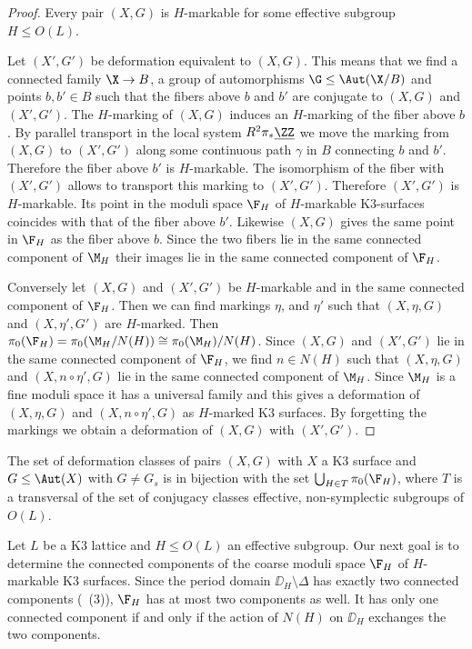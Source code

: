 \begin{proof}
Every pair $(X,G)$ is $H$-markable for some effective subgroup $H\leq O(L)$.

Let $(X',G')$ be deformation equivalent to $(X,G)$. This means that we find a connected family
$\X \to B$, a group of automorphisms $\G\leq \Aut(\X/B)$ and points $b,b' \in B$ such that the fibers above $b$ and $b'$ are conjugate to $(X,G)$ and $(X',G')$. The $H$-marking of $(X,G)$ induces an $H$-marking of the fiber above $b$. By parallel transport in the local system $R^2 \pi_*\underline{\ZZ}$ we move the marking from $(X,G)$ to $(X',G')$ along some continuous path $\gamma$ in $B$ connecting $b$ and $b'$. Therefore the fiber above $b'$ is $H$-markable. The isomorphism of the fiber with $(X',G')$ allows to transport this marking to $(X',G')$.  Therefore $(X',G')$ is $H$-markable. Its point in the moduli space $\F_H$ of $H$-markable K3-surfaces coincides with that of the fiber above $b'$. Likewise $(X,G)$ gives the same point in $\F_H$ as the fiber above $b$. Since the two fibers lie in the same connected component of $\M_H$ their images lie in the same connected component of $\F_H$.

Conversely let $(X,G)$ and $(X',G')$ be $H$-markable and in the same connected component of $\F_H$.
Then we can find markings $\eta$, and $\eta'$ such that $(X,\eta,G)$ and $(X,\eta',G')$ are $H$-marked.
Then $\pi_0(\F_H) = \pi_0(\M_H/N(H)) \cong \pi_0(\M_H)/N(H)$. Since $(X,G)$ and $(X',G')$ lie in the same connected component of $\F_H$, we find $n \in N(H)$ such that $(X,\eta,G)$ and $(X,n \circ \eta',G)$ lie in the same connected component of $\M_H$. Since $\M_H$ is a fine moduli space it has a universal family and this gives a deformation of $(X,\eta,G)$ and $(X,n \circ \eta',G)$ as $H$-marked K3 surfaces. By forgetting the markings we obtain a deformation of $(X,G)$ with $(X',G')$.
\end{proof}

\begin{corollary}
  The set of deformation classes of pairs $(X,G)$ with $X$ a K3 surface and $G \leq \Aut(X)$ with $G \neq G_s$ is in bijection with the set $\bigcup_{H \in T} \pi_0(\F_H)$, where $T$ is a transversal of the set of conjugacy classes effective, non-symplectic subgroups of $O(L)$.
\end{corollary}

Let $L$ be a K3 lattice and $H\leq O(L)$ an effective subgroup. Our next goal is to determine the connected components of the coarse moduli space $\F_H$ of $H$-markable K3 surfaces.
Since the period domain $\DD_H \setminus \Delta$ has exactly two connected components (~(3)), $\F_H$ has at most two components as well. It has only one connected component if and only if the action of $N(H)$ on $\DD_H$ exchanges the two components.

